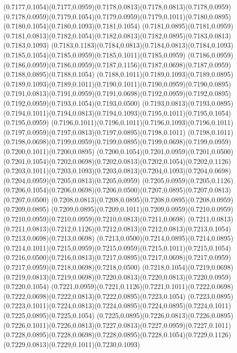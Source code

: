 (0.7177,0.1054)(0.7177,0.0959)(0.7178,0.0813)(0.7178,0.0813)(0.7178,0.0959)
\PST@Solid(0.7178,0.0959)(0.7179,0.1054)(0.7179,0.0959)(0.7179,0.1011)(0.7180,0.0895)(0.7180,0.1054)(0.7180,0.1093)(0.7181,0.1054)
(0.7181,0.0895)(0.7181,0.0959)(0.7181,0.0813)(0.7182,0.1054)(0.7182,0.0813)(0.7182,0.0895)(0.7183,0.0813)(0.7183,0.1093)
(0.7183,0.1183)(0.7184,0.0813)(0.7184,0.0813)(0.7184,0.1093)(0.7185,0.1054)(0.7185,0.0959)(0.7185,0.1011)(0.7185,0.0959)
(0.7186,0.0959)(0.7186,0.0959)(0.7186,0.0959)(0.7187,0.1156)(0.7187,0.0698)(0.7187,0.0959)(0.7188,0.0895)(0.7188,0.1054)
(0.7188,0.1011)(0.7189,0.1093)(0.7189,0.0895)(0.7189,0.1093)(0.7189,0.1011)(0.7190,0.1011)(0.7190,0.0959)(0.7190,0.0895)
(0.7191,0.0813)(0.7191,0.0959)(0.7191,0.0698)(0.7192,0.0959)(0.7192,0.0895)(0.7192,0.0959)(0.7193,0.1054)(0.7193,0.0500)
(0.7193,0.0813)(0.7193,0.0895)(0.7194,0.1011)(0.7194,0.0813)(0.7194,0.1093)(0.7195,0.1011)(0.7195,0.1054)(0.7195,0.0959)
(0.7196,0.1011)(0.7196,0.1011)(0.7196,0.1093)(0.7196,0.1011)(0.7197,0.0959)(0.7197,0.0813)(0.7197,0.0895)(0.7198,0.1011)
(0.7198,0.1011)(0.7198,0.0698)(0.7199,0.0959)(0.7199,0.0895)(0.7199,0.0698)(0.7199,0.0959)(0.7200,0.1011)(0.7200,0.0895)
(0.7200,0.1054)(0.7201,0.0959)(0.7201,0.0500)(0.7201,0.1054)(0.7202,0.0698)(0.7202,0.0813)(0.7202,0.1054)(0.7202,0.1126)
(0.7203,0.1011)(0.7203,0.1093)(0.7203,0.0813)(0.7204,0.1093)(0.7204,0.0698)(0.7204,0.0959)(0.7205,0.0813)(0.7205,0.0959)
(0.7205,0.0959)(0.7205,0.1126)(0.7206,0.1054)(0.7206,0.0698)(0.7206,0.0500)(0.7207,0.0895)(0.7207,0.0813)(0.7207,0.0500)
(0.7208,0.0813)(0.7208,0.0895)(0.7208,0.0895)(0.7208,0.0959)(0.7209,0.0895)
\PST@Solid(0.7209,0.0895)(0.7209,0.1011)(0.7209,0.0959)(0.7210,0.0959)(0.7210,0.0959)(0.7210,0.0959)(0.7210,0.0813)(0.7211,0.0698)
(0.7211,0.0813)(0.7211,0.0813)(0.7212,0.1126)(0.7212,0.0813)(0.7212,0.0813)(0.7213,0.1054)(0.7213,0.0698)(0.7213,0.0698)
(0.7213,0.0500)(0.7214,0.0895)(0.7214,0.0895)(0.7214,0.1011)(0.7215,0.0959)(0.7215,0.0959)(0.7215,0.1011)(0.7215,0.1054)
(0.7216,0.0500)(0.7216,0.0813)(0.7217,0.0895)(0.7217,0.0698)(0.7217,0.0959)(0.7217,0.0959)(0.7218,0.0698)(0.7218,0.0500)
(0.7218,0.1054)(0.7219,0.0698)(0.7219,0.0813)(0.7219,0.0698)(0.7220,0.0813)(0.7220,0.0813)(0.7220,0.0959)(0.7220,0.1054)
(0.7221,0.0959)(0.7221,0.1126)(0.7221,0.1011)(0.7222,0.0698)(0.7222,0.0698)(0.7222,0.0813)(0.7222,0.0895)(0.7223,0.1054)
(0.7223,0.0895)(0.7223,0.1011)(0.7224,0.0813)(0.7224,0.0895)(0.7224,0.0895)(0.7224,0.1011)(0.7225,0.0895)(0.7225,0.1054)
(0.7225,0.0895)(0.7226,0.0813)(0.7226,0.0895)(0.7226,0.1011)(0.7226,0.0813)(0.7227,0.0813)(0.7227,0.0959)(0.7227,0.1011)
(0.7228,0.0895)(0.7228,0.0698)(0.7228,0.0895)(0.7228,0.1054)(0.7229,0.1126)(0.7229,0.0813)(0.7229,0.1011)(0.7230,0.1093)

